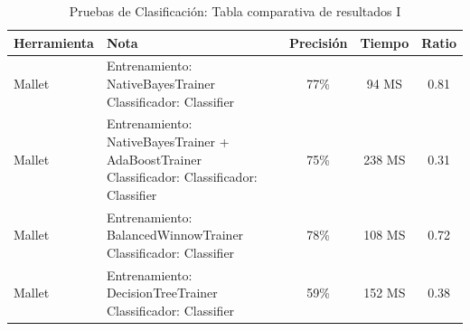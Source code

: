 \documentclass[runningheads,a4paper]{llncs}
\theoremstyle{break}
\newcommand{\rowstyle}[1]{\gdef\currentrowstyle{#1}%
  #1\ignorespaces
}
\begin{document}
\bgroup
\setlength{\tabcolsep}{10pt}
\def\arraystretch{1.8}
\begin{table}
\begin{tabular}{p{2.8cm}|p{4cm}|c|c|c}

\rowstyle{\bfseries} Herramienta & \rowstyle{\bfseries} Nota & \rowstyle{\bfseries} Precisión & \rowstyle{\bfseries} Tiempo & \rowstyle{\bfseries} Ratio\\  \hline
Mallet & Entrenamiento: NativeBayesTrainer \newline Classificador: Classifier                   & 77\%    & 94 MS & 0.81  \\ 
Mallet & Entrenamiento: NativeBayesTrainer + AdaBoostTrainer \newline Classificador: Classificador: Classifier & 75\%    & 238 MS & 0.31 \\
Mallet & Entrenamiento: BalancedWinnowTrainer \newline Classificador: Classifier                & 78\%    & 108 MS & 0.72 \\
Mallet & Entrenamiento: DecisionTreeTrainer \newline Classificador: Classifier                  & 59\%    & 152 MS & 0.38 \\ \hline
\end{tabular}
\vspace{1em}
\caption{Pruebas de Clasificación: Tabla comparativa de resultados I}
\end{table}
\egroup
\vspace{-1.5em}
\end{document}
